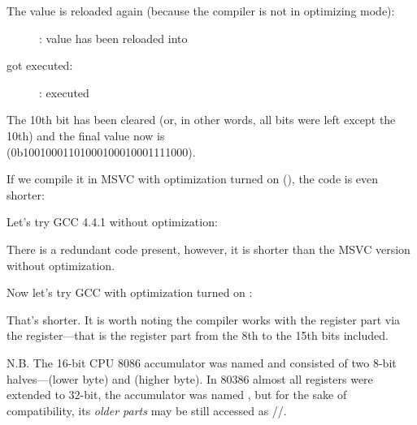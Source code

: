 \clearpage
The value is reloaded again (because the compiler is not in optimizing mode): 

\begin{figure}[H]
\centering
{}
\caption{\olly: value has been reloaded into \EDX}
\label{fig:set_reset_olly3}
\end{figure}

\clearpage
\AND got executed:

\begin{figure}[H]
\centering
{}
\caption{\olly: \AND executed}
\label{fig:set_reset_olly4}
\end{figure}

The 10th bit has been cleared (or, in other words, all bits were left except the 10th) and the final value now is \\
 (0b1001000110100010001{\color{red}0}001111000).


If we compile it in MSVC with optimization turned on (\Ox), the code is even shorter:




Let's try GCC 4.4.1 without optimization:



There is a redundant code present, however, it is shorter than the MSVC version without optimization.

Now let's try GCC with optimization turned on \Othree:




That's shorter.
It is worth noting the compiler works with the \EAX register part via the \AH register---that is the \EAX register part from the 8th to the 15th bits included.


N.B.  The 16-bit CPU 8086 accumulator was named \AX and consisted of two 8-bit 
halves---\AL (lower byte) and \AH (higher byte).
In 80386 almost all registers were extended to 32-bit, the accumulator was named \EAX, 
but for the sake of compatibility,
its \emph{older parts} may be still accessed as \AX/\AH/\AL.

